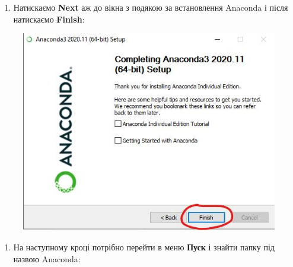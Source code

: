\documentclass[
  letterpaper,
]{report}
\providecommand{\tightlist}{%
  \setlength{\itemsep}{0pt}\setlength{\parskip}{0pt}}\usepackage{longtable,booktabs,array}
\begin{document}
\begin{enumerate}
\def\labelenumi{\arabic{enumi}.}
\setcounter{enumi}{10}
\tightlist
\item
  Натискаємо \textbf{Next} аж до вікна з подякою за встановлення
  Anaconda і після натискаємо \textbf{Finish}:
\end{enumerate}

\begin{figure}

{\centering \includegraphics{Images/ap1/Screenshot_12.jpg}

}

\end{figure}

\begin{enumerate}
\def\labelenumi{\arabic{enumi}.}
\setcounter{enumi}{11}
\tightlist
\item
  На наступному кроці потрібно перейти в меню \textbf{Пуск} і знайти
  папку під назвою Anaconda:
\end{enumerate}
\end{document}
